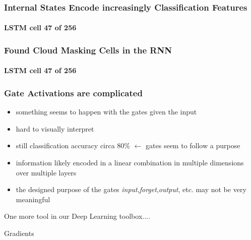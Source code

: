 %
%
%
%
%
%



\begin{frame}
\frametitle{Internal States Encode increasingly Classification Features}
\framesubtitle{LSTM cell \textbf{47} of 256}
\end{frame}
%
\begin{frame}
\frametitle{Found Cloud Masking Cells in the RNN}
\framesubtitle{LSTM cell \textbf{47} of 256}
\end{frame}

\begin{frame}
\frametitle{Gate Activations are complicated}

\begin{itemize}
\item something seems to happen with the gates given the input
\item hard to visually interpret
\item still classification accuracy circa 80\% $\leftarrow$ gates seem to follow a purpose
\item information likely encoded in a linear combination in multiple dimensions over multiple layers
\item the designed purpose of the gates \emph{input},\emph{forget},\emph{output}, etc. may not be very meaningful
\end{itemize}
\end{frame}

{
\begin{frame}[plain]

\vspace{8em}
\begin{center}
\Huge\color{tumwhite}
One more tool in our Deep Learning toolbox....
\end{center}\color{white}

\end{frame}
}

{
\begin{frame}[plain]

\vspace{8em}
\begin{center}
\Huge\color{tumbluedark}
Gradients
\end{center}\color{white}

\end{frame}
}

